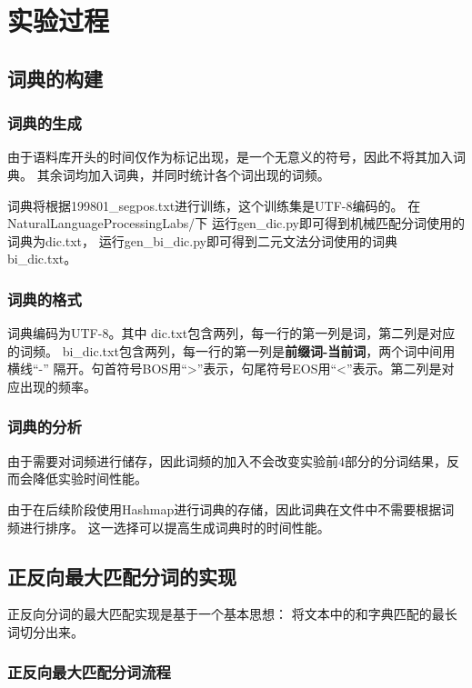 \section{实验过程}

\subsection{词典的构建}

\subsubsection{词典的生成}

由于语料库开头的时间仅作为标记出现，是一个无意义的符号，因此不将其加入词典。
其余词均加入词典，并同时统计各个词出现的词频。

词典将根据199801\_segpos.txt进行训练，这个训练集是UTF-8编码的。
在NaturalLanguageProcessingLabs/下
运行gen\_dic.py即可得到机械匹配分词使用的词典为dic.txt，
运行gen\_bi\_dic.py即可得到二元文法分词使用的词典bi\_dic.txt。

\subsubsection{词典的格式}

词典编码为UTF-8。其中
dic.txt包含两列，每一行的第一列是词，第二列是对应的词频。
bi\_dic.txt包含两列，每一行的第一列是\textbf{前缀词-当前词}，两个词中间用横线“-”
隔开。句首符号BOS用“>”表示，句尾符号EOS用“<”表示。第二列是对应出现的频率。

\subsubsection{词典的分析}

由于需要对词频进行储存，因此词频的加入不会改变实验前4部分的分词结果，反而会降低实验时间性能。

由于在后续阶段使用Hashmap进行词典的存储，因此词典在文件中不需要根据词频进行排序。
这一选择可以提高生成词典时的时间性能。

\subsection{正反向最大匹配分词的实现}

正反向分词的最大匹配实现是基于一个基本思想：
将文本中的和字典匹配的最长词切分出来\citep{张磊2009中文分词算法解析}。

\subsubsection{正反向最大匹配分词流程}

